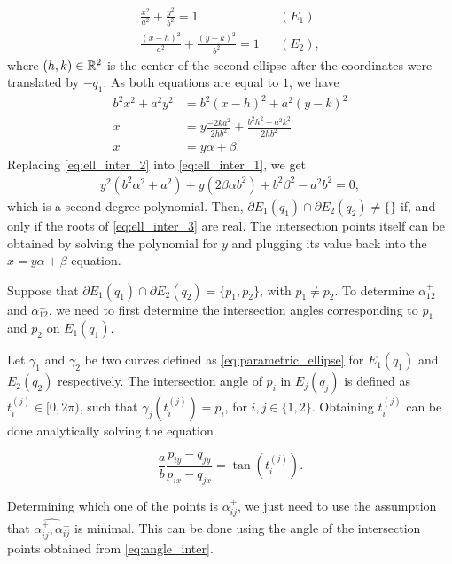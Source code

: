 \begin{align}
	\frac{x^2}{a^2} + \frac{y^2}{b^2} = 1 && (E_1) \label{eq:ell_inter_1}\\
	\frac{(x-h)^2}{a^2} + \frac{(y-k)^2}{b^2} = 1 && (E_2), \nonumber
\end{align}
where $(h,k)\in\mathbb{R}^2$ is the center of the second ellipse after the coordinates were translated by $-q_1$. As both equations are equal to $1$, we have
\begin{align}
	b^2x^2 + a^2y^2 &= b^2(x-h)^2 + a^2(y-k)^2 \nonumber\\
	x &= y\frac{-2ka^2}{2hb^2} + \frac{b^2h^2 + a^2k^2}{2hb^2} \nonumber\\
	x &= y\alpha + \beta.\label{eq:ell_inter_2}
\end{align}
Replacing \autoref{eq:ell_inter_2} into \autoref{eq:ell_inter_1}, we get
\begin{align}\label{eq:ell_inter_3}
	y^2(b^2\alpha^2 + a^2) + y(2\beta\alpha b^2) + b^2\beta^2 -a^2b^2 = 0,
\end{align}
which is a second degree polynomial. Then, $\partial E_1(q_1) \cap \partial E_2(q_2) \neq \{\}$ if, and only if the roots of \autoref{eq:ell_inter_3} are real. The intersection points itself can be obtained by solving the polynomial for $y$ and plugging its value back into the $x=y\alpha + \beta$ equation.

Suppose that $\partial E_1(q_1) \cap \partial E_2(q_2) = \{p_1, p_2\}$, with $p_1 \neq p_2$. To determine $\alpha_{12}^+$ and $\alpha_{12}^-$, we need to first determine the intersection angles corresponding to $p_1$ and $p_2$ on $E_1(q_1)$. 

Let $\gamma_1$ and $\gamma_2$ be two curves defined as \autoref{eq:parametric_ellipse} for $E_1(q_1)$ and $E_2(q_2)$ respectively. 
The intersection angle of $p_i$ in $E_j(q_j)$ is defined as $t_i^{(j)} \in [0, 2\pi)$, such that $\gamma_j(t_i^{(j)}) = p_i$, for $i, j \in \{1, 2\}$. Obtaining $t_i^{(j)}$ can be done analytically solving the equation

\begin{equation}\label{eq:angle_inter}
	\dfrac{a}{b}\dfrac{p_{iy}-q_{jy}}{p_{ix}-q_{jx}} = \tan{(t_i^{(j)})}.
\end{equation}

Determining which one of the points is $\alpha_{ij}^+$, we just need to use the assumption that $\widehat{\alpha_{ij}^+, \alpha_{ij}^-}$ is minimal. This can be done using the angle of the intersection points obtained from \autoref{eq:angle_inter}. 

